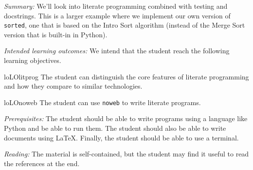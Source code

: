 
\emph{Summary:}
We'll look into literate programming combined with testing and docstrings.
This is a larger example where we implement our own version of \texttt{sorted}, 
one that is based on the Intro Sort algorithm (instead of the Merge Sort 
version that is built-in in Python).

\emph{Intended learning outcomes:}
We intend that the student reach the following learning objectives.
%
\begin{restatable}{lo}{LOlitprog}\label{LOlitprog}
  The student can distinguish the core features of literate programming and how 
  they compare to similar technologies.
\end{restatable}
%
\begin{restatable}{lo}{LOnoweb}\label{LOnoweb}
  The student can use \texttt{noweb} to write literate programs.
\end{restatable}

\emph{Prerequisites:}
The student should be able to write programs using a language like Python and 
be able to run them.
The student should also be able to write documents using \LaTeX.
Finally, the student should be able to use a terminal.

\emph{Reading:}
The material is self-contained, but the student may find it useful to read the 
references at the end.

